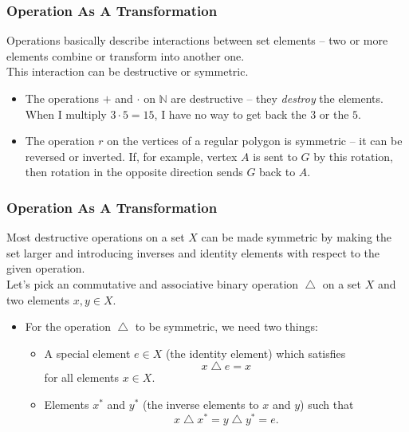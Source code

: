 \documentclass[aspectratio=169,11pt,usenames,dvipsnames,handout]{beamer}
\newcommand{\N}{\mathbb{N}}
\DeclareMathOperator{\tng}{\triangle}
\begin{document}
\begin{frame}
 \frametitle{Operation As A Transformation}
 \alert{Operations} basically describe interactions between set elements -- two
 or more elements combine or \alert{transform} into another one.\pause\\
 This interaction can be \alert{destructive} or \alert{symmetric}.\pause\\
 \begin{itemize}
  \item The operations $+$ and $ \cdot $ on $\N$ are \alert{destructive} -- they
   \emph{destroy} the elements. \pause
  When I multiply $3 \cdot 5 = 15$, I have no way to get back the $3$ or the
  $5$.\pause
 \item The operation $r$ on the vertices of a regular polygon is
  \alert{symmetric} -- it can be reversed or \alert{inverted}. \pause
  If, for example, vertex $A$ is sent to $G$ by this rotation, then rotation in
  the opposite direction sends $G$ back to $A$.
 \end{itemize}
\end{frame}

\begin{frame}
 \frametitle{Operation As A Transformation}
 Most destructive operations on a set $X$ \alert{can be made symmetric} by
 making the set larger and introducing \alert{inverses} and \alert{identity
 elements} with respect to the given operation.\pause\\
 Let's pick an commutative and associative \alert{binary} operation $\tng$ on a
 set $X$ and two elements $x,y \in X$.\pause
 \begin{itemize}
  \item For the operation $\tng$ to be \alert{symmetric}, we need two
   things:\pause
  \begin{itemize}[label=\textemdash]
   \item A special element $e \in X$ (the \alert{identity} element) which
    satisfies
    \[
     x \tng e = x
    \]
    for all elements $x \in X$.\pause
   \item Elements $x^{*}$ and $y^{*}$ (the \alert{inverse} elements to $x$ and
    $y$) such that
    \[
     x \tng x^{*} = y \tng y^{*} = e.
    \]
  \end{itemize}
 \end{itemize}
\end{frame}
\end{document}
